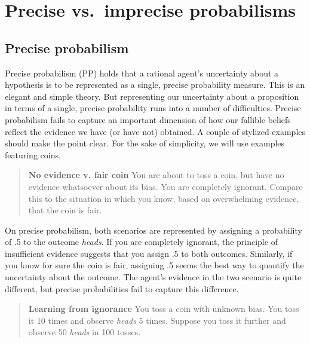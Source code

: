 \documentclass[
  10pt,
  dvipsnames,enabledeprecatedfontcommands]{scrartcl}
\begin{document}
\hypertarget{precise-vs.-imprecise-probabilisms}{%
\section{Precise vs.~imprecise
probabilisms}\label{precise-vs.-imprecise-probabilisms}}

\label{sec:three-probabilism}

\hypertarget{precise-probabilism}{%
\subsection{Precise probabilism}\label{precise-probabilism}}

Precise probabilism (\textsf{PP}) holds that a rational agent's
uncertainty about a hypothesis is to be represented as a single, precise
probability measure. This is an elegant and simple theory. But
representing our uncertainty about a proposition in terms of a single,
precise probability runs into a number of difficulties. Precise
probabilism fails to capture an important dimension of how our fallible
beliefs reflect the evidence we have (or have not) obtained. A couple of
stylized examples should make the point clear. For the sake of
simplicity, we will use examples featuring coins.

\begin{quote}
\textbf{No evidence v. fair coin}
You are about to toss a coin, but have no evidence 
whatsoever about its bias. You are completely ignorant. 
Compare this to the situation in which you know, 
based on overwhelming evidence, that the coin is fair. 
\end{quote}

\noindent On precise probabilism, both scenarios are represented by
assigning a probability of .5 to the outcome \emph{heads}. If you are
completely ignorant, the principle of insufficient evidence suggests
that you assign .5 to both outcomes. Similarly, if you know for sure the
coin is fair, assigning .5 seems the best way to quantify the
uncertainty about the outcome. The agent's evidence in the two scenario
is quite different, but precise probabilities fail to capture this
difference.

\begin{quote}
\textbf{Learning from ignorance}
You toss a coin with unknown bias. You toss it 10 times and observe \emph{heads} 5 times. Suppose you toss it further and observe 50 \emph{heads} in 100 tosses. 
\end{quote}
\end{document}
